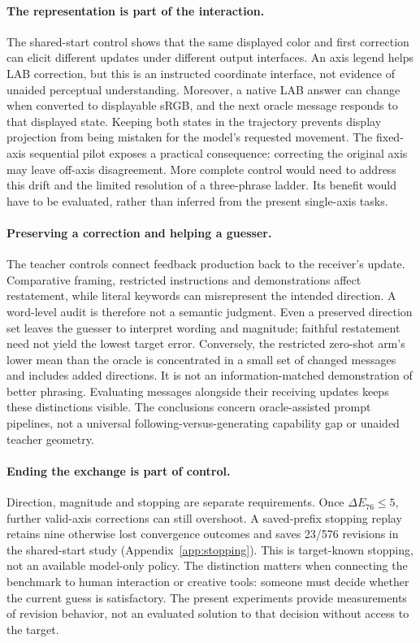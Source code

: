 \documentclass[11pt]{article}
\begin{document}
\paragraph{The representation is part of the interaction.}
The shared-start control shows that the same displayed color and first
correction can elicit different updates under different output interfaces.
An axis legend helps LAB correction, but this is an instructed coordinate
interface, not evidence of unaided perceptual understanding. Moreover, a
native LAB answer can change when converted to displayable sRGB, and the
next oracle message responds to that displayed state. Keeping both states
in the trajectory prevents display projection from being mistaken for the
model's requested movement. The fixed-axis sequential pilot exposes a
practical consequence: correcting the original axis may leave off-axis
disagreement. More complete control would need to address this drift and
the limited resolution of a three-phrase ladder. Its benefit would have
to be evaluated, rather than inferred from the present single-axis tasks.

\paragraph{Preserving a correction and helping a guesser.}
The teacher controls connect feedback production back to the receiver's
update. Comparative framing, restricted instructions and demonstrations
affect restatement, while literal keywords can misrepresent the intended
direction. A word-level audit is therefore not a semantic judgment.
Even a preserved direction set leaves the guesser to interpret wording
and magnitude; faithful restatement need not yield the lowest target
error. Conversely, the restricted zero-shot arm's lower mean than the
oracle is concentrated in a small set of changed messages and includes
added directions. It is not an information-matched demonstration of
better phrasing. Evaluating messages alongside their receiving updates
keeps these distinctions visible. The conclusions concern oracle-assisted
prompt pipelines, not a universal following-versus-generating capability
gap or unaided teacher geometry.

\paragraph{Ending the exchange is part of control.}
Direction, magnitude and stopping are separate requirements. Once
$\Delta E_{76}\leq5$, further valid-axis corrections can still overshoot.
A saved-prefix stopping replay retains nine otherwise lost convergence
outcomes and saves 23/576 revisions in the shared-start study
(Appendix~\ref{app:stopping}). This is target-known stopping, not an
available model-only policy. The distinction matters when connecting
the benchmark to human interaction or creative tools: someone must decide
whether the current guess is satisfactory. The present experiments
provide measurements of revision behavior, not an evaluated solution to
that decision without access to the target.
\end{document}
